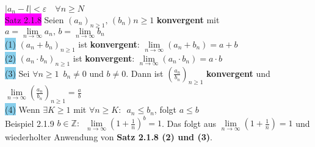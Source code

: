 \documentclass[landscape, 10pt]{article}
\begin{document}
\begin{multicols}{3}
{                            $|a_n-l|<\varepsilon \quad\forall n\geqslant N$}\\
              \colorbox{magenta}{Satz 2.1.8} 
                     Seien \textcolor{NavyBlue}{
                     $(a_n)_{n\geqslant 1},\,(b_n){n\geqslant 1}$} 
                     \textbf{konvergent} mit 
                     \textcolor{NavyBlue}{$a=\lim\limits_{n\to\infty}a_n,\,
                     b=\lim\limits_{n\to\infty}b_n$}\\
                     \colorbox{SkyBlue}{(1)} 
                            \textcolor{NavyBlue}{$(a_n+b_n)_{n\geqslant 1}$} 
                            ist \textbf{konvergent}: 
                            \textcolor{NavyBlue}{
                            $\lim\limits_{n\to\infty}(a_n+b_n)=a+b$}\\
                     \colorbox{SkyBlue}{(2)} 
                            \textcolor{NavyBlue}{$(a_n\cdot b_n)_{n\geqslant 1}$} 
                            ist \textbf{konvergent}: 
                            \textcolor{NavyBlue}{
                            $\lim\limits_{n\to\infty}(a_n\cdot b_n)=a\cdot b$}\\
                     \colorbox{SkyBlue}{(3)} Sei 
                            \textcolor{NavyBlue}{$\forall n\geqslant 1\enspace b_n\neq 0$} 
                            und \textcolor{NavyBlue}{$b\neq 0$}. 
                            Dann ist 
                            \textcolor{NavyBlue}{$(\frac{a_n}{b_n})_{n\geqslant 1}$} 
                            \textbf{konvergent} und 
                            \textcolor{NavyBlue}{
                            $\lim\limits_{n\to\infty}(\frac{a_n}{b_n})_{n\geqslant 1}
                            =\frac{a}{b}$}\\
                     \colorbox{SkyBlue}{(4)} Wenn 
                            \textcolor{NavyBlue}{$\exists K\geqslant 1$} 
                            mit \textcolor{NavyBlue}{
                            $\forall n\geqslant K: \enspace a_n\leqslant b_n$}, 
                            folgt \textcolor{NavyBlue}{$a\leqslant b$}\\
              \colorbox{Dandelion}{Beispiel 2.1.9} 
                     \textcolor{NavyBlue}{$b\in\mathbb{Z}:\enspace
                     \lim\limits_{n\to\infty}(1+\frac{1}{n})^b=1$}.
                     Das folgt aus
                     \textcolor{NavyBlue}{
                     $\lim\limits_{n\to\infty}(1+\frac{1}{n})=1$}
                     und wiederholter Anwendung von
                     \textbf{Satz 2.1.8 (2) und (3)}.

\end{multicols}
\end{document}
